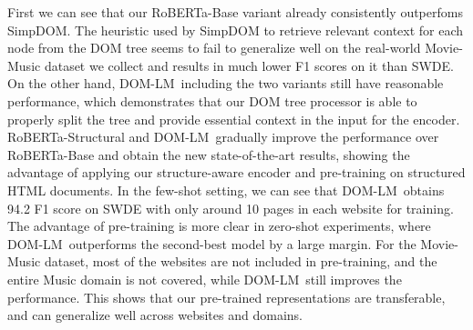 \documentclass[sigconf, nonacm]{acmart}
\newcommand{\ours}[0]{DOM-LM}
\begin{document}
First we can see that our RoBERTa-Base variant already consistently outperfoms SimpDOM. The heuristic used by SimpDOM to retrieve relevant context for each node from the DOM tree seems to fail to generalize well on the real-world Movie-Music dataset we collect and results in much lower F1 scores on it than SWDE. On the other hand, \ours\ including the two variants still have reasonable performance, which demonstrates that our DOM tree processor is able to properly split the tree and provide essential context in the input for the encoder. RoBERTa-Structural and \ours\ gradually improve the performance over RoBERTa-Base and obtain the new state-of-the-art results, showing the advantage of applying our structure-aware encoder and pre-training on structured HTML documents. In the few-shot setting, we can see that \ours\ obtains 94.2 F1 score on SWDE with only around 10 pages in each website for training. The advantage of pre-training is more clear in zero-shot experiments, where \ours\ outperforms the second-best model by a large margin. For the Movie-Music dataset, most of the websites are not included in pre-training, and the entire Music domain is not covered, while \ours\ still improves the performance. This shows that our pre-trained representations are transferable, and can generalize well across websites and domains.
\end{document}
